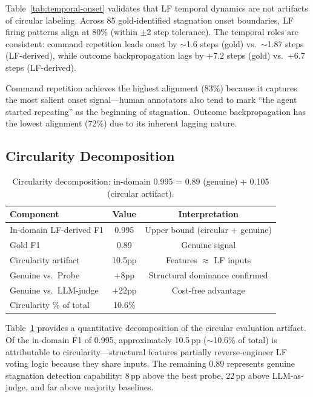 \documentclass[11pt,a4paper]{article}
\begin{document}
Table~\ref{tab:temporal-onset} validates that LF temporal dynamics are not artifacts of circular labeling.
Across 85 gold-identified stagnation onset boundaries, LF firing patterns align at 80\% (within $\pm$2 step tolerance).
The temporal roles are consistent: command repetition leads onset by $\sim$1.6 steps (gold) vs.\ $\sim$1.87 steps (LF-derived), while outcome backpropagation lags by $+$7.2 steps (gold) vs.\ $+$6.7 steps (LF-derived).

Command repetition achieves the highest alignment (83\%) because it captures the most salient onset signal---human annotators also tend to mark ``the agent started repeating'' as the beginning of stagnation.
Outcome backpropagation has the lowest alignment (72\%) due to its inherent lagging nature.

\subsection{Circularity Decomposition}

\begin{table}[t]
\centering
\small
\begin{tabular}{lcc}
\toprule
Component & Value & Interpretation \\
\midrule
In-domain LF-derived F1 & 0.995 & Upper bound (circular + genuine) \\
Gold F1 & 0.89 & Genuine signal \\
Circularity artifact & 10.5pp & Features $\approx$ LF inputs \\
Genuine vs.\ Probe & $+$8pp & Structural dominance confirmed \\
Genuine vs.\ LLM-judge & $+$22pp & Cost-free advantage \\
Circularity \% of total & 10.6\% & \\
\bottomrule
\end{tabular}
\caption{Circularity decomposition: in-domain 0.995 = 0.89 (genuine) + 0.105 (circular artifact).}
\label{tab:circularity}
\end{table}

Table~\ref{tab:circularity} provides a quantitative decomposition of the circular evaluation artifact.
Of the in-domain F1 of 0.995, approximately 10.5\,pp ($\sim$10.6\% of total) is attributable to circularity---structural features partially reverse-engineer LF voting logic because they share inputs.
The remaining 0.89 represents genuine stagnation detection capability: 8\,pp above the best probe, 22\,pp above LLM-as-judge, and far above majority baselines.
\end{document}
